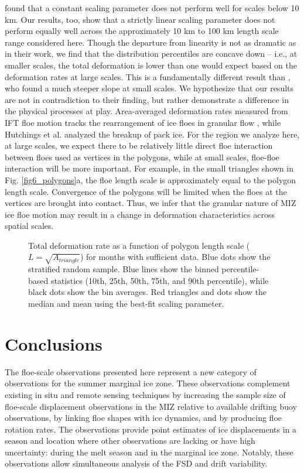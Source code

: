 \documentclass[aog]{igs}
\begin{document}
\cite{hutchings2024_SeaIce} found that a constant scaling parameter does not perform well for scales below 10 km. Our results, too, show that a strictly linear scaling parameter does not perform equally well across the approximately 10 km to 100 km length scale range considered here. Though the departure from linearity is not as dramatic as in their work, we find that the distribution percentiles are concave down -- i.e., at smaller scales, the total deformation is lower than one would expect based on the deformation rates at large scales. 
This is a fundamentally different result than \cite{hutchings2024_SeaIce}, who found a much steeper slope at small scales. We hypothesize that our results are not in contradiction to their finding, but rather demonstrate a difference in the physical processes at play. 
Area-averaged deformation rates measured from IFT floe motion tracks the rearrangement of ice floes in granular flow \citep{herman2022_GranularEffects}, while Hutchings et al. analyzed the breakup of pack ice.
For the region we analyze here, at large scales, we expect there to be relatively little direct floe interaction between floes used as vertices in the polygons, while at small scales, floe-floe interaction will be more important. For example, in the small triangles shown in Fig. \ref{fig6_polygons}a, the floe length scale is approximately equal to the polygon length scale. Convergence of the polygons will be limited when the floes at the vertices are brought into contact. Thus, we infer that the granular nature of MIZ ice floe motion may result in a change in deformation characteristics across spatial scales. 

\begin{figure*}
\caption{Total deformation rate as a function of polygon length scale ($L = \sqrt{A_{triangle}}$) for months with sufficient data. Blue dots show the stratified random sample. Blue lines show the binned percentile-based statistics (10th, 25th, 50th, 75th, and 90th percentile), while black dots show the bin averages. Red triangles and dots show the median and mean using the best-fit scaling parameter.}
\label{fig:strain_rates}
\end{figure*}

\section{Conclusions}
The floe-scale observations presented here represent a new category of observations for the summer marginal ice zone.
These observations complement existing in situ and remote sensing techniques by increasing the sample size of floe-scale displacement observations in the MIZ relative to available drifting buoy observations, by linking floe shapes with ice dynamics, and by producing floe rotation rates. The observations provide point estimates of ice displacements in a season and location where other observations are lacking or have high uncertainty: during the melt season and in the marginal ice zone. Notably, these observations allow simultaneous analysis of the FSD and drift variability.
\end{document}
